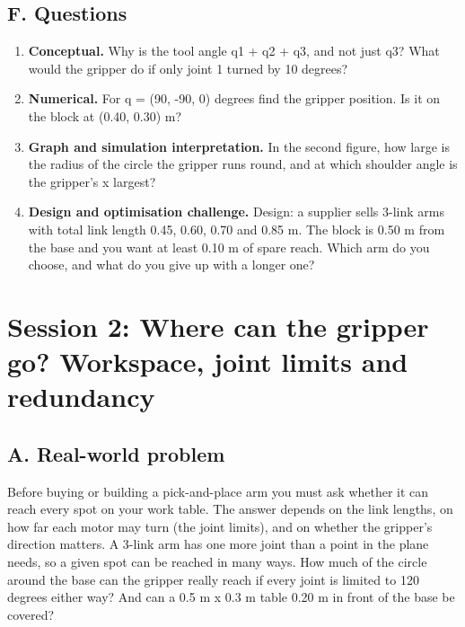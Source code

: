 \documentclass[11pt,a4paper]{article}
\begin{document}
\subsection*{F. Questions}
\begin{enumerate}[nosep]
\item \textbf{Conceptual.} Why is the tool angle q1 + q2 + q3, and not just q3? What would the gripper do if only joint 1 turned by 10 degrees?
\item \textbf{Numerical.} For q = (90, -90, 0) degrees find the gripper position. Is it on the block at (0.40, 0.30) m?
\item \textbf{Graph and simulation interpretation.} In the second figure, how large is the radius of the circle the gripper runs round, and at which shoulder angle is the gripper's x largest?
\item \textbf{Design and optimisation challenge.} Design: a supplier sells 3-link arms with total link length 0.45, 0.60, 0.70 and 0.85 m. The block is 0.50 m from the base and you want at least 0.10 m of spare reach. Which arm do you choose, and what do you give up with a longer one?
\end{enumerate}

\section{Session 2: Where can the gripper go? Workspace, joint limits and redundancy}

\subsection*{A. Real-world problem}
Before buying or building a pick-and-place arm you must ask whether it can reach every spot on your work table. The answer depends on the link lengths, on how far each motor may turn (the joint limits), and on whether the gripper's direction matters. A 3-link arm has one more joint than a point in the plane needs, so a given spot can be reached in many ways. How much of the circle around the base can the gripper really reach if every joint is limited to 120 degrees either way? And can a 0.5 m x 0.3 m table 0.20 m in front of the base be covered?
\end{document}
